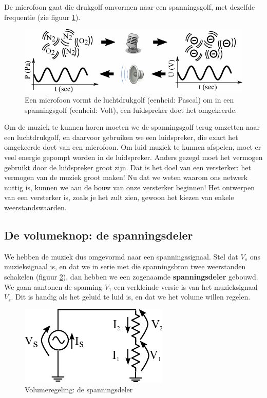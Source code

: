 \documentclass{article}
\begin{document}
			De microfoon gaat die drukgolf omvormen naar een spanningsgolf, met dezelfde frequentie (zie figuur \ref{fig:micro}).
			\begin{figure}[htbp]
				\centering
				\includegraphics[scale=1.2]{micro}
				\caption{Een microfoon vormt de luchtdrukgolf (eenheid: Pascal) om in een spanningsgolf (eenheid: Volt), een luidspreker doet het omgekeerde.}
				\label{fig:micro}
			\end{figure}

			Om de muziek te kunnen horen moeten we de spanningsgolf terug omzetten naar een luchtdrukgolf, en daarvoor gebruiken we een luidspreker, die exact het omgekeerde doet van een microfoon. Om luid muziek te kunnen afspelen, moet er veel energie gepompt worden in de luidspreker. Anders gezegd moet het vermogen gebruikt door de luidspreker groot zijn. Dat is het  doel van een versterker: het vermogen van de muziek groot maken! Nu dat we weten waarom ons netwerk nuttig is, kunnen we aan de bouw van onze versterker beginnen! Het ontwerpen van een versterker is, zoals je het zult zien, gewoon het kiezen van enkele weerstandswaarden.

		\subsection{De volumeknop: de spanningsdeler}

			We hebben de muziek dus omgevormd naar een spanningssignaal. Stel dat $V_s$ ons muzieksignaal is, en dat we in serie met die spanningsbron twee weerstanden schakelen (figuur \ref{fig:volume}), dan hebben we een zogenaamde \textbf{spanningsdeler} gebouwd. We gaan aantonen de spanning $V_1$ een verkleinde versie is van het muzieksignaal $V_s$. Dit is handig als het geluid te luid is, en dat we het volume willen regelen.

			\begin{figure}[htbp]
				\centering
				\includegraphics{weerstandsdeler}
				\caption{Volumeregeling: de spanningsdeler}
				\label{fig:volume}
			\end{figure}
\end{document}
